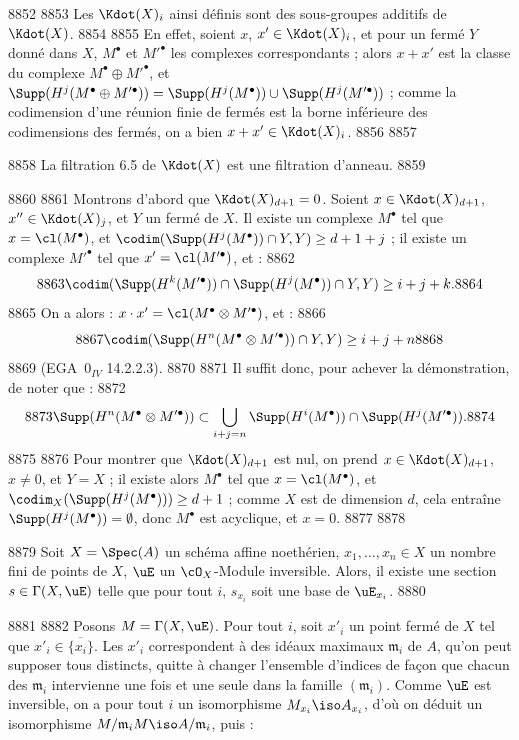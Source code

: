   8852	
  8853	Les $\Kdot(X)_i$ ainsi d\'efinis sont des sous-groupes additifs de $\Kdot(X)$.
  8854	
  8855	En effet, soient $x$, $x' \in \Kdot(X)_i$, et pour un ferm\'e $Y$ donn\'e dans $X$, $M^{\bullet}$ et $M'^{\bullet}$ les complexes correspondants ; alors $x + x'$ est la classe du complexe $M^{\bullet} \oplus M'^{\bullet}$, et $\Supp(H^j(M^{\bullet} \oplus M'^{\bullet})) = \Supp(H^j(M^{\bullet})) \cup \Supp(H^j(M'^{\bullet}))$ ; comme la codimension d'une r\'eunion finie de ferm\'es est la borne inf\'erieure des codimensions des ferm\'es, on a bien $x + x' \in \Kdot(X)_i$.
  8856	
  8857	\begin{proposition}[6.6]
  8858	La filtration 6.5 de $\Kdot(X)$ est une filtration d'anneau.
  8859	\end{proposition}
  8860	
  8861	Montrons d'abord que $\Kdot(X)_{d+1} = 0$. Soient $x \in \Kdot(X)_{d+1}$, $x'' \in \Kdot(X)_j$, et $Y$ un ferm\'e de $X$. Il existe un complexe $M^{\bullet}$ tel que $x = \cl(M^{\bullet})$, et $\codim(\Supp(H^j(M^{\bullet})) \cap Y, Y) \geq d + 1 + j$ ; il existe un complexe $M'^{\bullet}$ tel que $x' = \cl(M'^{\bullet})$, et :
  8862	\[
  8863	\codim(\Supp(H^k(M'^{\bullet})) \cap \Supp(H^j(M^{\bullet})) \cap Y, Y) \geq i + j + k.
  8864	\]
  8865	On a alors : $x \cdot x' = \cl(M^{\bullet} \otimes M'^{\bullet})$, et :
  8866	\[
  8867	\codim(\Supp(H^n(M^{\bullet} \otimes M'^{\bullet})) \cap Y, Y) \geq i + j + n
  8868	\]
  8869	(EGA~$0_{IV}$ 14.2.2.3).
  8870	
  8871	Il suffit donc, pour achever la d\'emonstration, de noter que :
  8872	\[
  8873	\Supp(H^n(M^{\bullet} \otimes M'^{\bullet})) \subset \bigcup_{i+j=n} \Supp(H^i(M^{\bullet})) \cap \Supp(H^j(M'^{\bullet})).
  8874	\]
  8875	
  8876	Pour montrer que $\Kdot(X)_{d+1}$ est nul, on prend $x \in \Kdot(X)_{d+1}$, $x \neq 0$, et $Y = X$ ; il existe alors $M^{\bullet}$ tel que $x = \cl(M^{\bullet})$, et $\codim_X(\Supp(H^j(M^{\bullet}))) \geq d + 1$ ; comme $X$ est de dimension $d$, cela entra\^ine $\Supp(H^j(M^{\bullet})) = \emptyset$, donc $M^{\bullet}$ est acyclique, et $x = 0$.
  8877	
  8878	\begin{lemme}[6.7]
  8879	Soit $X = \Spec(A)$ un sch\'ema affine noeth\'erien, $x_1,\dots,x_n \in X$ un nombre fini de points de $X$, $\uE$ un $\cO_X$-Module inversible. Alors, il existe une section $s \in \Gamma(X,\uE)$ telle que pour tout $i$, $s_{x_i}$ soit une base de $\uE_{x_i}$.
  8880	\end{lemme}
  8881	
  8882	Posons $M = \Gamma(X,\uE)$. Pour tout $i$, soit $x'_i$ un point ferm\'e de $X$ tel que $x'_i \in \overline{\{x_i\}}$. Les $x'_i$ correspondent \`a des id\'eaux maximaux $\mathfrak{m}_i$ de $A$, qu'on peut supposer tous distincts, quitte \`a changer l'ensemble d'indices de fa\c{c}on que chacun des $\mathfrak{m}_i$ intervienne une fois et une seule dans la famille $(\mathfrak{m}_i)$. Comme $\uE$ est inversible, on a pour tout $i$ un isomorphisme $M_{x_i} \iso A_{x_i}$, d'o\`u on d\'eduit un isomorphisme $M/\mathfrak{m}_i M \iso A/\mathfrak{m}_i$, puis :
